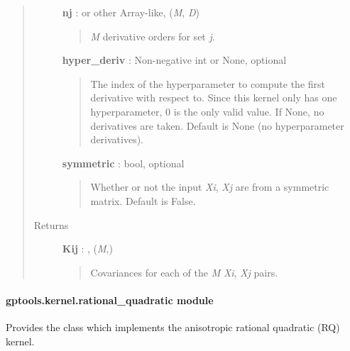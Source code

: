 \documentclass[letterpaper,10pt,english]{sphinxmanual}
\begin{document}
\begin{fulllineitems}
\begin{fulllineitems}
\begin{quote}
\begin{description}
\textbf{nj} :  or other Array-like, (\emph{M}, \emph{D})
\begin{quote}

\emph{M} derivative orders for set \emph{j}.
\end{quote}

\textbf{hyper\_deriv} : Non-negative int or None, optional
\begin{quote}

The index of the hyperparameter to compute the first derivative
with respect to. Since this kernel only has one hyperparameter, 0
is the only valid value. If None, no derivatives are taken. Default
is None (no hyperparameter derivatives).
\end{quote}

\textbf{symmetric} : bool, optional
\begin{quote}

Whether or not the input \emph{Xi}, \emph{Xj} are from a symmetric matrix.
Default is False.
\end{quote}

\item[{Returns}] \leavevmode
\textbf{Kij} : , (\emph{M},)
\begin{quote}

Covariances for each of the \emph{M} \emph{Xi}, \emph{Xj} pairs.
\end{quote}

\end{description}\end{quote}

\end{fulllineitems}


\end{fulllineitems}



\paragraph{gptools.kernel.rational\_quadratic module}
\label{gptools.kernel:gptools-kernel-rational-quadratic-module}\label{gptools.kernel:module-gptools.kernel.rational_quadratic}
Provides the {\hyperref[gptools.kernel:gptools.kernel.rational_quadratic.RationalQuadraticKernel]{}} class which implements the anisotropic rational quadratic (RQ) kernel.
\end{document}
